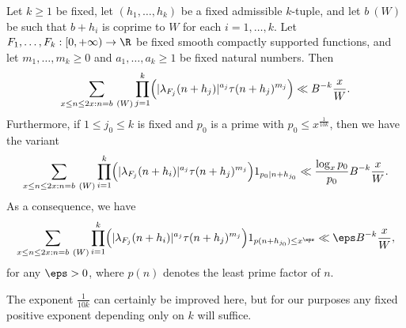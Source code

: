 \begin{proposition}\label{almostprime} Let $k \geq 1$ be fixed, let $(h_1,\dots,h_k)$ be a fixed admissible $k$-tuple, and let $b\ (W)$ be such that $b+h_i$ is coprime to $W$ for each $i=1,\dots,k$.  Let $F_1,\dots,F_k: [0,+\infty) \to \R$ be fixed smooth compactly supported functions, and let $m_1,\dots,m_k \geq 0$ and $a_1,\dots,a_k \geq 1$ be fixed natural numbers.  Then
\begin{equation}\label{lambdatau}
\sum_{x \leq n \leq 2x: n = b\ (W)} \prod_{j=1}^k \Bigl(|\lambda_{F_j}(n+h_j)|^{a_j} \tau(n+h_j)^{m_j}\Bigr) \ll B^{-k} \frac{x}{W}.
\end{equation}
Furthermore, if $1 \leq j_0 \leq k$ is fixed and $p_0$ is a prime with $p_0 \leq x^{\frac{1}{10k}}$, then we have the variant
\begin{equation}\label{lambdatau-fix}
\sum_{x \leq n \leq 2x: n = b\ (W)} \prod_{i=1}^k \Bigl(|\lambda_{F_j}(n+h_i)|^{a_j} \tau(n+h_j)^{m_j}\Bigr) 1_{p_0|n+h_{j_0}} \ll \frac{\log_x p_0}{p_0} B^{-k} \frac{x}{W}.
\end{equation}
As a consequence, we have
\begin{equation}\label{lambdatau-fix2}
\sum_{x \leq n \leq 2x: n = b\ (W)} \prod_{i=1}^k \Bigl(|\lambda_{F_j}(n+h_i)|^{a_j} \tau(n+h_j)^{m_j}\Bigr) 1_{p(n+h_{j_0}) \leq x^\eps} \ll \eps B^{-k} \frac{x}{W},
\end{equation}
for any $\eps > 0$, where $p(n)$ denotes the least prime factor of $n$.
\end{proposition}

The exponent $\frac{1}{10k}$ can certainly be improved here, but for our purposes any fixed positive exponent depending only on $k$ will suffice.

